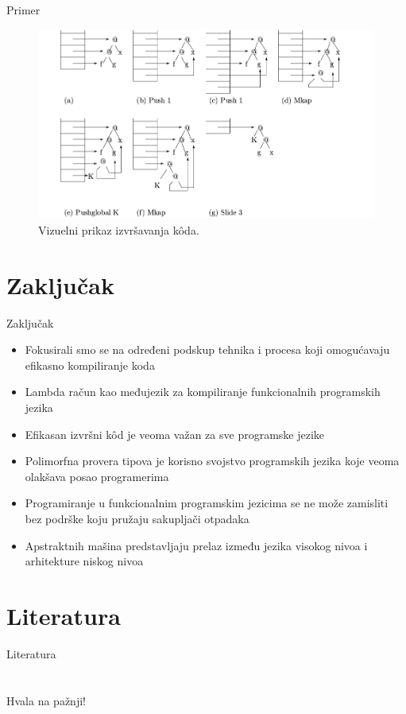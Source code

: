 \documentclass[xcolor={dvipsnames}, 11pt]{beamer}
\begin{document}
\begin{frame}{Primer}
	\begin{figure}[H]
		\centering
		\includegraphics[width=\linewidth]{primerGmasine.png}
		\caption{Vizuelni prikaz izvršavanja k\^ oda.}
		\label{fig:primerGmasine}
	\end{figure}

\end{frame}

\section{Zaključak}
\begin{frame}{Zaključak}
	\begin{itemize}
		\item Fokusirali smo se na određeni podskup tehnika i procesa koji omogućavaju efikasno
		kompiliranje koda
		\item Lambda račun kao međujezik za kompiliranje funkcionalnih programskih jezika
		\item Efikasan izvršni k\^ od je veoma važan za sve programske jezike
		\item Polimorfna provera tipova je korisno svojstvo programskih jezika koje veoma olakšava posao programerima
		\item Programiranje u funkcionalnim programskim jezicima se ne može zamisliti bez podrške koju pružaju sakupljači otpadaka 
		\item Apstraktnih mašina predstavljaju prelaz između jezika visokog nivoa i arhitekture niskog nivoa
	\end{itemize}
\end{frame}


\section{Literatura}
\begin{frame}{Literatura}
	
\end{frame}

\section{}
\begin{frame}
	\centering \Large Hvala na pažnji!
\end{frame}
	
	
\end{document}
